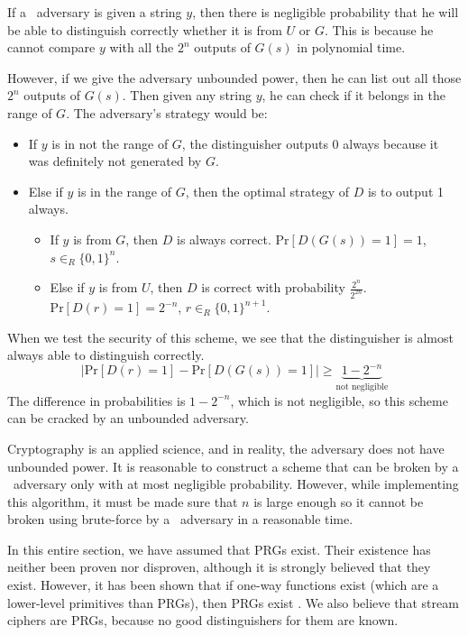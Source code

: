 \documentclass[11pt]{article}
\begin{document}
If a \ppt\ adversary is given a string \(y\), then there is negligible probability that he will be able to distinguish correctly whether it is from \(U\) or \(G\). This is because he cannot compare \(y\) with all the \(2^n\) outputs of \(G(s)\) in polynomial time. 

However, if we give the adversary unbounded power, then he can list out all those \(2^n\) outputs of \(G(s)\). Then given any string \(y\), he can check if it belongs in the range of \(G\). The adversary's strategy would be:

\begin{itemize}
    \item If \(y\) is in not the range of \(G\), the distinguisher outputs \(0\) always because it was definitely not generated by \(G\). 
    \item Else if \(y\) is in the range of \(G\), then the optimal strategy of \(D\) is to output 1 always. 
    \begin{itemize} 
    \item If \(y\) is from \(G\), then \(D\) is always correct. \(\mathrm{Pr}[D(G(s)) = 1] = 1\), \( s \in _R \{0, 1\}^n\).
    \item Else if \(y\) is from \(U\), then \(D\) is correct with probability \(\frac{2^n}{2^{2n}}\).  \(\mathrm{Pr}[D(r) = 1] = 2^{-n}\), \(r \in_R \{0, 1\}^{n+1}\).

    \end{itemize}
\end{itemize}

When we test the security of this scheme, we see that the distinguisher is almost always able to distinguish correctly. 
\[ \big| \mathrm{Pr}[D(r) = 1] - \mathrm{Pr}[D(G(s)) = 1] \big| \ge \underbrace{1 - 2^{-n}}_\textrm{not negligible}\]
The difference in probabilities is \(1 - 2^{-n}\), which is not negligible, so this scheme can be cracked by an unbounded adversary. 

Cryptography is an applied science, and in reality, the adversary does not have unbounded power. It is reasonable to construct a scheme that can be broken by a \ppt\ adversary only with at most negligible probability. However, while implementing this algorithm, it must be made sure that \(n\) is large enough so it cannot be broken using brute-force by a \ppt\ adversary in a reasonable time.

In this entire section, we have assumed that PRGs exist. Their existence has neither been proven nor disproven, although it is strongly believed that they exist. However, it has been shown that if one-way functions exist (which are a lower-level primitives than PRGs), then PRGs exist \cite{goldreich}. We also believe that stream ciphers are PRGs, because no good distinguishers for them are known.
\end{document}
